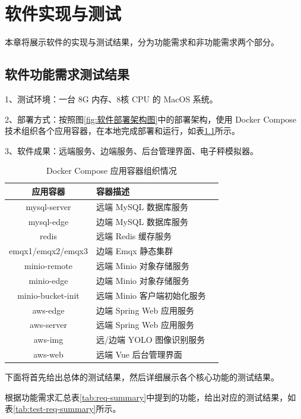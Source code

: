 \chapter{软件实现与测试}

本章将展示软件的实现与测试结果，分为功能需求和非功能需求两个部分。

\section{软件功能需求测试结果}\label{sec:test-func}

1、测试环境：一台 8G 内存、8核 CPU 的 MacOS 系统。

2、部署方式：按照图\ref{fig:软件部署架构图}中的部署架构，使用 Docker Compose 技术组织各个应用容器，在本地完成部署和运行，如表\ref{tab:docker-compose}所示。

3、软件成果：远端服务、边端服务、后台管理界面、电子秤模拟器。

\begin{longtable}[ht]{|c|p{8cm}|c|}
\caption{Docker Compose 应用容器组织情况}
\label{tab:docker-compose}
\\
\hline
应用容器 & 容器描述 \\\hline
mysql-server & 远端 MySQL 数据库服务  \\\hline
mysql-edge & 边端 MySQL 数据库服务  \\\hline
redis & 远端 Redis 缓存服务  \\\hline
emqx1/emqx2/emqx3 & 边端 Emqx 静态集群  \\\hline
minio-remote & 远端 Minio 对象存储服务  \\\hline
minio-edge & 边端 Minio 对象存储服务  \\\hline
minio-bucket-init & 远端 Minio 客户端初始化服务  \\\hline
aws-edge & 边端 Spring Web 应用服务  \\\hline
aws-server & 远端 Spring Web 应用服务  \\\hline
aws-img & 远/边端 YOLO 图像识别服务  \\\hline
aws-web & 远端 Vue 后台管理界面  \\\hline
\end{longtable}

下面将首先给出总体的测试结果，然后详细展示各个核心功能的测试结果。

根据功能需求汇总表\ref{tab:req-summary}中提到的功能，给出对应的测试结果，如表\ref{tab:test-req-summary}所示。

